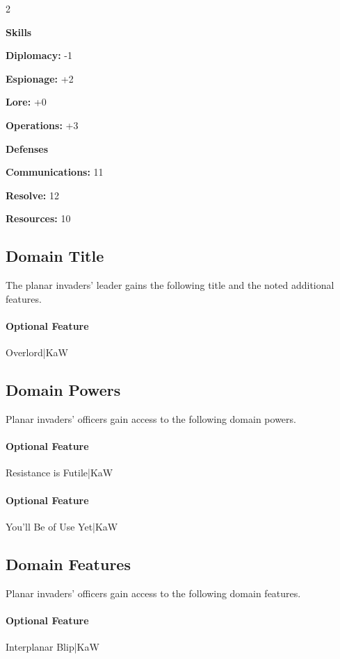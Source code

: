 \documentclass[10pt,a4paper,twoside,bg=print,twocolumn,openany,nodeprecatedcode]{dndbook}
\begin{document}
\begin{itemize}
\begin{multicols}{2}
\item \textbf{Skills}
\item \textbf{Diplomacy:} -1
\item \textbf{Espionage:} +2
\item \textbf{Lore:} +0
\item \textbf{Operations:} +3
\item \textbf{Defenses}
\item \textbf{Communications:} 11
\item \textbf{Resolve:} 12
\item \textbf{Resources:} 10
\end{multicols}

\end{itemize}

\subsection{Domain Title}
The planar invaders' leader gains the following title and the noted additional features.

\paragraph{Optional Feature}
Overlord|KaW

\subsection{Domain Powers}
Planar invaders' officers gain access to the following domain powers.

\paragraph{Optional Feature}
Resistance is Futile|KaW

\paragraph{Optional Feature}
You'll Be of Use Yet|KaW

\subsection{Domain Features}
Planar invaders' officers gain access to the following domain features.

\paragraph{Optional Feature}
Interplanar Blip|KaW
\end{document}
